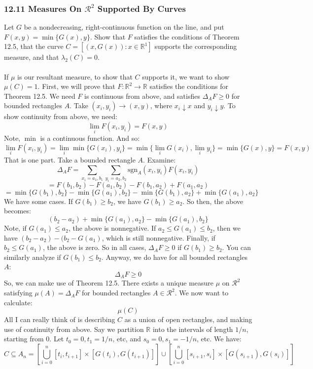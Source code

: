 \documentclass[12pt,a4paper]{article}
\newcommand{\1}[1]{\mathbbm{1}\left\{ #1 \right\}}
\newcommand{\R}{\mathbb{R}}
\newcommand{\rcal}{\mathcal{R}}
\newcommand{\sgn}{\text{sgn}}
\begin{document}
\subsubsection{12.11 Measures On $\rcal^2$ Supported By Curves} Let $G$ be a nondecreasing, right-continuous function on the line, and put $F(x,y) = \min\{G(x),y\}$. Show that $F$ satisfies the conditions of Theorem 12.5, that the curve $C = \left[(x,G(x)) : x \in \R^1\right]$ supports the corresponding measure, and that $\lambda_2(C) = 0$.
\\\\
If $\mu$ is our resultant measure, to show that $C$ supports it, we want to show $\mu(C) = 1$. First, we will prove that $F: \R^2 \to \R$ satisfies the conditions for Theorem 12.5. We need $F$ is continuous from above, and satisfies $\Delta_AF \geq 0$ for bounded rectangles $A$. Take $(x_i,y_i) \to (x,y)$, where $x_i \downarrow x$ and $y_i \downarrow y$. To show continuity from above, we need:
$$
	\lim_i F(x_i,y_i) = F(x,y)
$$
Note, $\min$ is a continuous function. And so:
$$
	\lim_i F(x_i,y_i) = \lim_i \min\{G(x_i),y_i\} =
	\min\{\lim_i G(x_i), \lim_i y_i\} = \min\{G(x),y\} = F(x,y)
$$
That is one part. Take a bounded rectangle $A$. Examine:
$$
	\Delta_AF =
	\sum_{x_i = a_1,b_1} \sum_{y_i = a_2,b_2} \sgn_A(x_i,y_i)F(x_i,y_i)
$$
$$
	= F(b_1,b_2) - F(a_1,b_2) - F(b_1,a_2) + F(a_1,a_2)
$$
$$
	= \min\{G(b_1),b_2\} - \min\{G(a_1),b_2\} - \min\{G(b_1),a_2\} + \min\{G(a_1),a_2\}
$$
We have some cases. If $G(b_1) \geq b_2$, we have $G(b_1) \geq a_2$. So then, the above becomes:
$$
	(b_2 - a_2) + \min\{G(a_1),a_2\} - \min\{G(a_1),b_2\}
$$
Note, if $G(a_1) \leq a_2$, the above is nonnegative. If $a_2 \leq G(a_1) \leq b_2$, then we have $(b_2 - a_2) - (b_2 - G(a_1)$, which is still nonnegative. Finally, if $b_2 \leq G(a_1)$, the above is zero. So in all cases, $\Delta_AF \geq 0$ if $G(b_1) \geq b_2$. You can similarly analyze if $G(b_1) \leq b_2$. Anyway, we do have for all bounded rectangles $A$:
$$
	\Delta_AF \geq 0
$$
So, we can make use of Theorem 12.5. There exists a unique measure $\mu$ on $\rcal^2$ satisfying $\mu(A) = \Delta_AF$ for bounded rectangles $A \in \rcal^2$. We now want to calculate:
$$
	\mu(C)
$$
All I can really think of is describing $C$ as a union of open rectangles, and making use of continuity from above. Say we partition $\R$ into the intervals of length $1/n$, starting from $0$. Let $t_0 = 0, t_1 = 1/n$, etc, and $s_0 = 0, s_1 = -1/n$, etc. We have:
$$
	C \subseteq A_n = \left[\bigcup_{i=0}^n [t_i, t_{i+1}] \times [G(t_i), G(t_{i+1})]\right]
	\cup
	\left[\bigcup_{i=0}^n [s_{i+1}, s_i] \times [G(s_{i+1}), G(s_i)]\right]
$$
\end{document}
